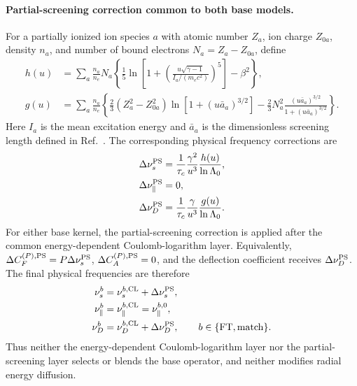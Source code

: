\documentclass[11pt]{article}
\begin{document}
\paragraph{Partial-screening correction common to both base models.}
For a partially ionized ion species $a$ with atomic number $Z_a$, ion charge
$Z_{0a}$, density $n_a$, and number of bound electrons $N_a=Z_a-Z_{0a}$, define
\cite{Hesslow2017Screening,Hesslow2018Collision,Hesslow2019Dreicer}
\begin{align}
 h(u)
 &=\sum_a\frac{n_a}{n_e}N_a
 \left\{
  \frac15\ln\left[
   1+\left(\frac{u\sqrt{\gamma-1}}{I_a/(m_ec^2)}\right)^5
  \right]-\beta^2
 \right\},
 \label{eq:physical_h}\\
 g(u)
 &=\sum_a\frac{n_a}{n_e}
 \left\{
  \frac23(Z_a^2-Z_{0a}^2)
       \ln\left[1+(u\bar a_a)^{3/2}\right]
  -\frac23N_a^2
       \frac{(u\bar a_a)^{3/2}}{1+(u\bar a_a)^{3/2}}
 \right\}.
 \label{eq:physical_g}
\end{align}
Here $I_a$ is the mean excitation energy and $\bar a_a$ is the dimensionless screening
length defined in Ref.~\cite{Hesslow2018Collision}.  The corresponding physical
frequency corrections are
\begin{align}
 \Delta\nu_s^{\rm PS}
 &=\frac{1}{\tau_c}\frac{\gamma^2}{u^3}
   \frac{h(u)}{\ln\Lambda_0},\\
 \Delta\nu_\parallel^{\rm PS}&=0,\\
 \Delta\nu_D^{\rm PS}
 &=\frac{1}{\tau_c}\frac{\gamma}{u^3}
   \frac{g(u)}{\ln\Lambda_0}.
 \label{eq:physical_partial_screening_overlay}
\end{align}
For either base kernel, the partial-screening correction is applied after the common
energy-dependent Coulomb-logarithm layer.  Equivalently,
$\Delta C_F^{(P),\rm PS}=P\Delta\nu_s^{\rm PS}$,
$\Delta C_A^{(P),\rm PS}=0$, and the deflection coefficient receives
$\Delta\nu_D^{\rm PS}$.  The final physical frequencies are therefore
\begin{align}
 \nu_s^b&=\nu_s^{b,\rm CL}+\Delta\nu_s^{\rm PS},\\
 \nu_\parallel^b&=\nu_\parallel^{b,\rm CL}=\nu_\parallel^{b,0},\\
 \nu_D^b&=\nu_D^{b,\rm CL}+\Delta\nu_D^{\rm PS},
 \qquad b\in\{\mathrm{FT},\mathrm{match}\}.
 \label{eq:physical_final_collision_layers}
\end{align}
Thus neither the energy-dependent Coulomb-logarithm layer nor the partial-screening layer
selects or blends the base operator, and neither modifies radial energy diffusion.
\end{document}

